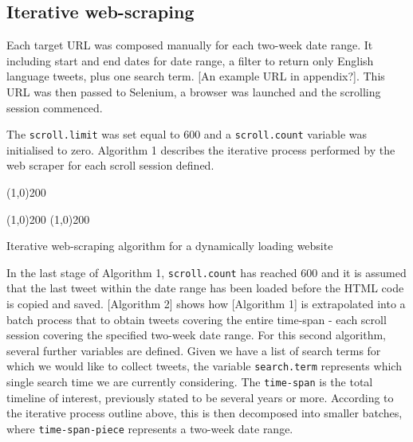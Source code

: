 \documentclass{article}
\begin{document}
\subsection{Iterative web-scraping}
\label{sec-3-3}

Each target URL was composed manually for each two-week date range. It including start and end dates for date range, a filter to return only English language tweets, plus one search term. [An example URL in appendix?]. This URL was then passed to Selenium, a browser was launched and the scrolling session commenced.

The \texttt{scroll.limit} was set equal to 600 and a \texttt{scroll.count} variable was initialised to zero.
Algorithm 1 describes the iterative process performed by the web scraper for each scroll session defined.

\vspace{7mm}

\linethickness{0.35mm}
\line(1,0){200}\newline
\begin{algorithm}[H]
  \vspace{-2mm}
  \linethickness{0.3mm}
  \line(1,0){200}\newline
  \vspace{-1.5mm}
  \linethickness{0.35mm}
  \line(1,0){200}\newline
  \caption{Iterative web-scraping algorithm for a dynamically loading website}
\end{algorithm}

\vspace{7mm}

In the last stage of Algorithm 1, \texttt{scroll.count} has reached 600 and it is assumed that the last tweet within the date range has been loaded before the HTML code is copied and saved.
[Algorithm 2] shows how [Algorithm 1] is extrapolated into a batch process that to obtain tweets covering the entire time-span - each scroll session covering the specified two-week date range. For this second algorithm, several further variables are defined. Given we have a list of search terms for which we would like to collect tweets, the variable \texttt{search.term} represents which single search time we are currently considering. The \texttt{time-span} is the total timeline of interest, previously stated to be several years or more. According to the iterative process outline above, this is then decomposed into smaller batches, where \texttt{time-span-piece} represents a two-week date range.
\end{document}
